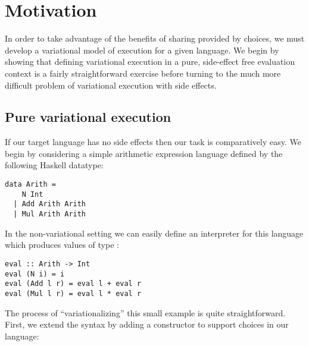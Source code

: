 \documentclass[12pt,oneside]{book}
\begin{document}
\begin{center}
\end{center}




\chapter{Motivation}
\label{ch:mot}

In order to take advantage of the benefits of sharing provided by choices, we must develop a variational
model of execution for a given language. We begin by showing that defining variational execution in a pure,
side-effect free evaluation context is a fairly straightforward exercise before turning to the much more
difficult problem of variational execution with side effects.

\section{Pure variational execution}
\label{sec:purevar}

If our target language has no side effects then
our task is comparatively easy. We begin by considering a simple arithmetic expression language
defined by the following Haskell datatype:

\begin{lstlisting}
data Arith =
    N Int
  | Add Arith Arith
  | Mul Arith Arith
\end{lstlisting}

In the non-variational setting we can easily define an interpreter for this language which produces
values of type :

\begin{lstlisting}
eval :: Arith -> Int
eval (N i) = i
eval (Add l r) = eval l + eval r
eval (Mul l r) = eval l * eval r
\end{lstlisting}

The process of ``variationalizing'' this small example is quite straightforward. First, we extend the syntax by adding a
constructor to support choices in our language:
\end{document}
